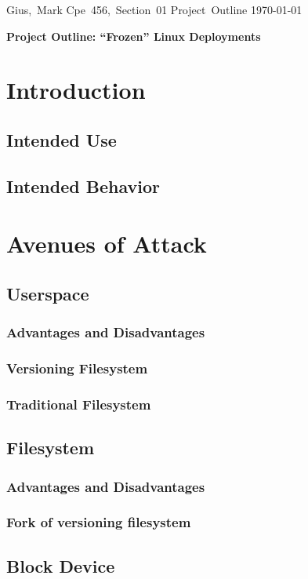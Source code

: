 \documentclass[11pt]{article}
\begin{document}
\hfill\vbox{\hbox{Gius, Mark}
            \hbox{Cpe 456, Section 01} 
            \hbox{Project Outline}   
            \hbox{\today}}\par

\bigskip
\centerline{\Large\bf Project Outline: ``Frozen'' Linux Deployments}\par
\bigskip

\section{Introduction}
\subsection{Intended Use}
\subsection{Intended Behavior}

\section{Avenues of Attack}
\subsection{Userspace}
\subsubsection{Advantages and Disadvantages}
\subsubsection{Versioning Filesystem}
\subsubsection{Traditional Filesystem}
\subsection{Filesystem}
\subsubsection{Advantages and Disadvantages}
\subsubsection{Fork of versioning filesystem}
\subsection{Block Device}
\end{document}
